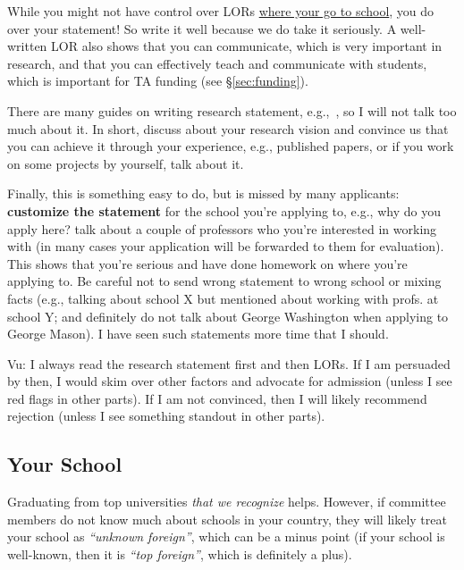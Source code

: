 \documentclass[11pt]{article}
\newenvironment{commentbox}{
 \small
    \begin{cbox}
 }{
   \end{cbox}
}
\begin{document}
While you might not have control over LORs \hyperref[sec:your-school]{where your go to school}, you do over your
statement! So write it well because we do take it seriously.
A well-written LOR also shows that you can communicate, which is very important in research, and that you can effectively teach and communicate with students, which is important for TA funding (see \S\ref{sec:funding}).

There are many guides on writing research statement, e.g.,~\cite{blattman2022writing},
so I will not talk too much about it. In short, discuss about your research vision and convince us that you can achieve it through your experience, e.g., published papers, or if you work on some projects by yourself, talk about it.

Finally, this is something easy to do, but is missed by many
applicants: \textbf{customize the statement} for the school you're applying to,
e.g., why do you apply here? talk about a couple of professors who you're interested in working with (in many cases your application will be forwarded to them for evaluation).
This shows that you're serious and have done homework on where you're applying to.
Be careful not to send wrong statement to wrong school or mixing
facts (e.g., talking about school X but mentioned about working with
profs. at school Y; and definitely do not talk about George Washington when applying to George Mason). I have seen such statements more time that I
should.


\begin{commentbox}
\small
Vu: I always read the research statement first and then LORs. If I am
persuaded by then, I would skim over other factors and advocate for
admission (unless I see red flags in other parts). If I am not
convinced, then I will likely recommend rejection (unless I see
something standout in other parts).
\end{commentbox}


\subsection{Your School}\label{sec:your-school}

Graduating from top universities \emph{that we recognize} helps.
However, if committee members do not know much about schools in your country, they will likely treat your school as
\emph{``unknown foreign''}, which can be a minus point (if your school is well-known, then it is \emph{``top foreign''}, which is definitely a plus).
\end{document}
